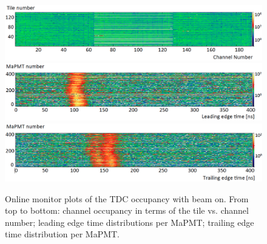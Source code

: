 \documentclass[5p,times,twocolumn]{elsarticle}
\begin{document}
\begin{figure}[t]
\begin{center}
\includegraphics[width=1.0\columnwidth]{Online1.png}
\includegraphics[width=1.0\columnwidth]{Online2.png}
\includegraphics[width=1.0\columnwidth]{Online3.png}
\end{center}
\caption{Online monitor plots of the TDC occupancy with beam on. From top to bottom: channel occupancy in terms of the
  tile vs. channel number; leading edge time distributions per MaPMT; trailing edge time distribution per MaPMT.}
\label{fig:Online_TDC}
\end{figure}



\end{document}
